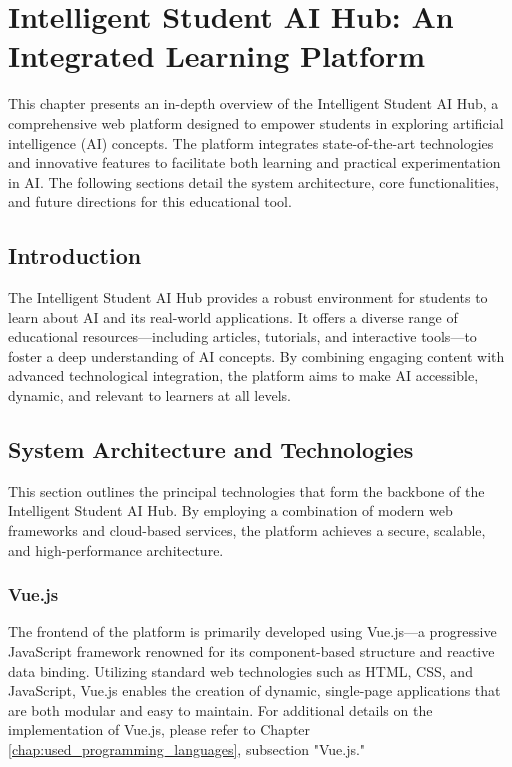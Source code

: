 \chapter{Intelligent Student AI Hub: An Integrated Learning Platform} 
\label{chap:Student_AI_Hub}

This chapter presents an in-depth overview of the Intelligent Student AI Hub, 
a comprehensive web platform designed to empower students in exploring artificial intelligence (AI) concepts. 
The platform integrates state-of-the-art technologies and innovative features to facilitate both learning and practical experimentation in AI. 
The following sections detail the system architecture, core functionalities, and future directions for this educational tool.

\section{Introduction}

The Intelligent Student AI Hub provides a robust environment for students to learn about AI and its real-world applications. 
It offers a diverse range of educational resources—including articles, tutorials, and interactive tools—to foster a deep understanding of AI concepts. 
By combining engaging content with advanced technological integration, the platform aims to make AI accessible, dynamic, and relevant to learners at all levels.

\section{System Architecture and Technologies}

This section outlines the principal technologies that form the backbone of the Intelligent Student AI Hub. By employing a combination of modern web frameworks and cloud-based services, the platform achieves a secure, scalable, and high-performance architecture.

\subsection{Vue.js}

The frontend of the platform is primarily developed using Vue.js—a progressive JavaScript framework renowned for its component-based structure and reactive data binding. Utilizing standard web technologies such as HTML, CSS, and JavaScript, Vue.js enables the creation of dynamic, single-page applications that are both modular and easy to maintain. For additional details on the implementation of Vue.js, please refer to Chapter \ref{chap:used_programming_languages}, subsection "Vue.js."

